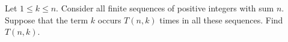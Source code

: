 Let $1 \leq k \leq n$. Consider all finite sequences of positive integers with sum $n$. Suppose that the term $k$ occurs $T(n, k)$ times in all these sequences. Find $T(n, k)$.
